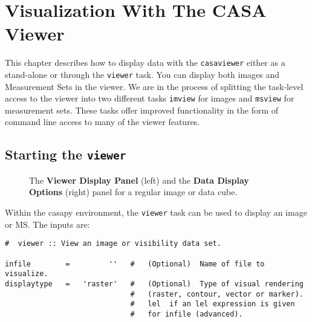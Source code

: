 

\chapter{Visualization With The CASA Viewer}
\label{chapter:display}

This chapter describes how to display data with the {\tt casaviewer}
either as a stand-alone or through the {\tt viewer} task. You can
display both images and Measurement Sets in the viewer. We are
in the process of splitting the task-level access to the viewer into 
two different tasks {\tt imview} for images and {\tt msview} for measurement 
sets. These tasks offer improved functionality in the form of command
line access to many of the viewer features. 

\section{Starting the {\tt viewer}}
\label{section:display.start}

\begin{figure}[h!]
\begin{center}
\caption{\label{fig:viewer_start} The {\bf Viewer Display Panel} (left) and 
the {\bf Data Display Options} (right) panel for a regular image or data cube.}
\hrulefill
\end{center}
\end{figure}

Within the casapy environment, the {\tt viewer} task
can be used to display an image or MS.  The inputs are:
\small
\begin{verbatim}
#  viewer :: View an image or visibility data set.

infile        =         ''   #   (Optional)  Name of file to visualize.
displaytype   =   'raster'   #   (Optional)  Type of visual rendering
                             #   (raster, contour, vector or marker).
                             #   lel  if an lel expression is given
                             #   for infile (advanced).

\end{verbatim}
\normalsize

